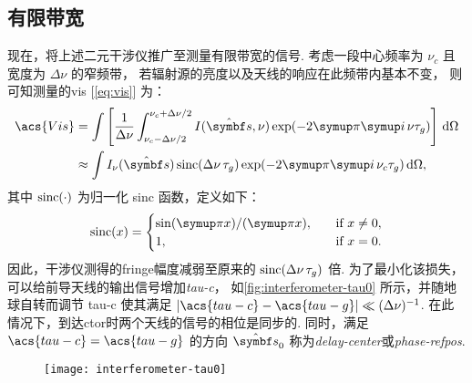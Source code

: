 \subsection{有限带宽}

现在，将上述二元干涉仪推广至测量有限带宽的信号.
考虑一段中心频率为 $\nu_c$ 且宽度为 $\Delta\nu$ 的窄频带，
若辐射源的亮度以及天线的响应在此频带内基本不变，
则可知测量的\acl{vis} [\autoref{eq:vis}] 为：
\begin{align}
  \acs{Vis} &= \int \left[ \frac{1}{\Delta\nu}
        \int_{\nu_c-\Delta\nu/2}^{\nu_c+\Delta\nu/2}
        I(\hat{\B{s}}, \nu) \exp (-2\Cpi\Ci\, \nu\tau_g)
      \right] \D{\Omega} \\
    &\approx \int I_{\nu}(\hat{\B{s}}) \sinc (\Delta\nu\,\tau_g)
      \exp (-2\Cpi\Ci\, \nu_c\tau_g) \D{\Omega},
  \label{eq:vis-bw}
\end{align}
其中 $\operatorname{sinc}(\cdot)$ 为归一化 sinc 函数，定义如下：
\begin{equation}
  \label{eq:sinc}
  \sinc(x) =
    \begin{cases}
      \sin(\Cpi x) / (\Cpi x), & \quad \text{if } x \neq 0, \\
      1, & \quad \text{if } x = 0.
    \end{cases}
\end{equation}
因此，干涉仪测得的\acl{fringe}幅度减弱至原来的 $\operatorname{sinc}(\Delta\nu\,\tau_g)$ 倍.
为了最小化该损失，可以给前导天线的输出信号增加\emph{\acf{tau-c}}，
如\autoref{fig:interferometer-tau0} 所示，并随地球自转而调节 \acs{tau-c}
使其满足 $|\acs{tau-c} - \acs{tau-g}| \ll (\Delta\nu)^{-1}$.
在此情况下，到达\acl{ctor}时两个天线的信号的相位是同步的.
同时，满足 $\acs{tau-c} = \acs{tau-g}$ 的方向 $\hat{\B{s}}_0$
称为\emph{\acf{delay-center}}或\emph{\acf{phase-refpos}}.

\begin{figure}[htp]
  \centering
  \texttt{[image: interferometer-tau0]}
  \label{fig:interferometer-tau0}
\end{figure}

